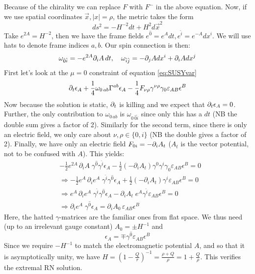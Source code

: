 \documentclass[11pt, class=article, crop=false]{standalone}
\begin{document}
\begin{enumerate}
	Because of the chirality we can replace $F$ with $F^-$ in the above equation. Now, if we use spatial coordinates $\vec x, |x| = \rho$, the metric takes the form
	\[
		ds^2 = -H^{-2} dt + H^2 d\vec x^2 
	\]
	Take $e^{2A}= H^{-2}$, then we have the frame fields $e^{\hat 0} = e^{A} dt, e^{\hat i} = e^{-A} dx^i$. We will use hats to denote frame indices $a,b$. Our spin connection is then:
	\[
		\omega_{\hat 0 \hat i} = - e^{2A} \partial_i A \,dt, \quad \omega_{\hat i \hat j} = - \partial_j A dx^i + \partial_i A dx^j
	\]
	First let's look at the $\mu= 0$ constraint of equation \eqref{eq:SUSYvar}
	\[
		\partial_t \epsilon_A + \frac14 \omega_{0\, ab} \Gamma^{ab} \epsilon_A - \frac14 F_{\nu \rho} \gamma^{\nu \rho} \gamma_0 \varepsilon_{AB} \epsilon^B
	\]
	Now because the solution is static, $\partial_t$ is killing and we expect that $\partial_t \epsilon_A = 0$. Further, the only contribution to $\omega_{0\, ab}$ is $\omega_{0 \, \hat 0 \hat i}$ since only this has a $dt$ (NB the double sum gives a factor of 2). Similarly for the second term, since there is only an electric field, we only care about $\nu,\rho \in \{0,i\}$ (NB the double gives a factor of 2). Finally, we have only an electric field $F_{0i} = -\partial_i A_t$ ($A_t$ is the vector potential, not to be confused with $A$). This yields:
	\[
	\begin{aligned}
		&-\frac12 e^{2A} \, \partial_i A\; \gamma^{\hat 0} \gamma^{\hat i} \epsilon_A  - \frac12 (-\partial_i A_t) \gamma^{0} \gamma^{i} \gamma_0 \varepsilon_{AB} \epsilon^B = 0\\
		&\Rightarrow -\frac12 e^{A} \, \partial_i e^{A}\; \gamma^{\hat i} \gamma^{\hat 0} \epsilon_A  + \frac12 (-\partial_i A_t) \gamma^{i} \varepsilon_{AB} \epsilon^B = 0\\
		&\Rightarrow e^A \, \partial_i e^A \; \gamma^{\hat i} \gamma^{\hat 0} \epsilon_A  - \partial_i A_t \; e^A \gamma^{\hat i} \varepsilon_{AB} \epsilon^B = 0\\
		 &{\Rightarrow \partial_i e^{A} \; \gamma^{\hat 0} \epsilon_A = \partial_i A_0 \,  \varepsilon_{AB} \epsilon^B} 
	\end{aligned}
	\]
	Here, the hatted $\gamma$-matrices are the familiar ones from flat space. 
	We thus need (up to an irrelevant gauge constant) $A_0 = \pm H^{-1}$ and
	\begin{equation}\label{eq:spinorconstraint}
		\epsilon_A = \mp \gamma^{\hat 0} \varepsilon_{AB} \epsilon^B
	\end{equation}
	Since we require $-H^{-1}$ to match the electromagnetic potential $A$, and so that it is asymptotically unity, we have $H = (1 - \frac{Q}{r})^{-1} = \frac{\rho+Q}{\rho} = 1 + \frac{Q}{\rho}$. This verifies the extremal RN solution. 
	

\end{enumerate}
\end{document}
